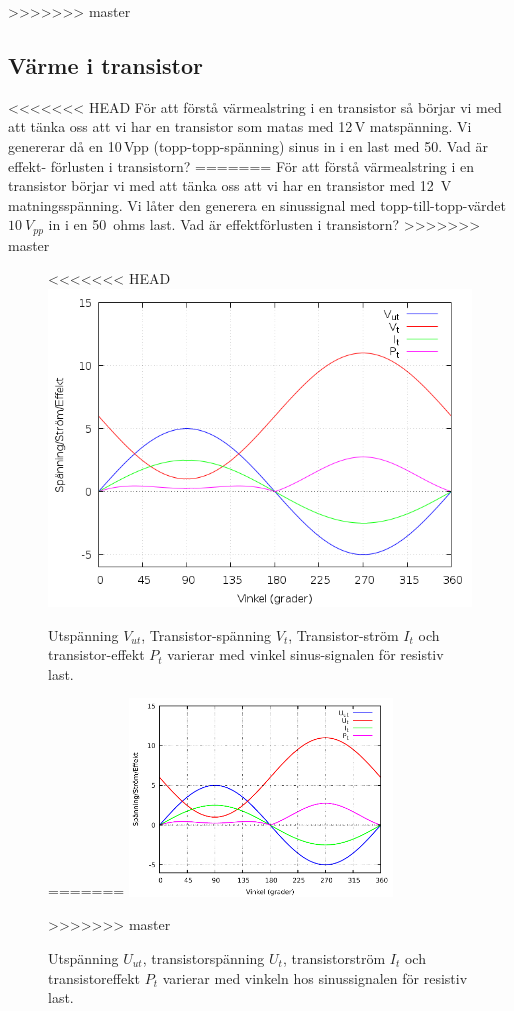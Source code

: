 >>>>>>> master
\subsection{Värme i transistor}

<<<<<<< HEAD
För att förstå värmealstring i en transistor så börjar vi med att tänka oss
att vi har en transistor som matas med 12\,V matspänning. Vi genererar då en
10\,Vpp (topp-topp-spänning) sinus in i en last med \SI{50}{\Omega}. Vad är effekt-
förlusten i transistorn?
=======
För att förstå värmealstring i en transistor börjar vi med att tänka oss
att vi har en transistor med 12~V matningsspänning. Vi låter den generera en
sinussignal med topp-till-topp-värdet \(10\ V_{pp}\) in i en 50~ohms last.
Vad är effektförlusten i transistorn?
>>>>>>> master

\begin{figure}
\begin{center}
<<<<<<< HEAD
\includegraphics[width=.85\textwidth]{images/power1.png}
\caption{Utspänning $V_{ut}$, Transistor-spänning $V_t$, Transistor-ström $I_t$ och transistor-effekt $P_t$ varierar med vinkel sinus-signalen för resistiv last.}
=======
\includegraphics[width=7cm]{images/power1.pdf}
\caption{Utspänning $U_{ut}$, transistorspänning $U_t$, transistorström $I_t$ och transistoreffekt $P_t$ varierar med vinkeln hos sinussignalen för resistiv last.}
>>>>>>> master
\label{fig:power1}
\end{center}
\end{figure}

